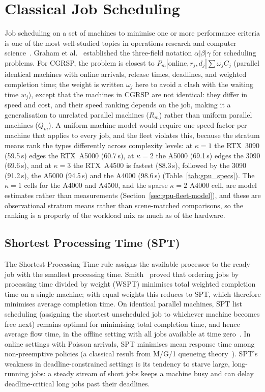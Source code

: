 \section{Classical Job Scheduling}
\label{sec:classical-job-scheduling}

Job scheduling on a set of machines to minimise one or more performance criteria is one of the most well-studied topics in operations research and computer science~\cite{pinedo2016scheduling}. Graham et al.~\cite{graham1979optimization} established the three-field notation $\alpha|\beta|\gamma$ for scheduling problems. For CGRSP, the problem is closest to $P_m|\text{online}, r_j, d_j|\sum \omega_j C_j$ (parallel identical machines with online arrivals, release times, deadlines, and weighted completion time; the weight is written $\omega_j$ here to avoid a clash with the waiting time $w_j$), except that the machines in CGRSP are not identical: they differ in speed and cost, and their speed ranking depends on the job, making it a generalisation to unrelated parallel machines ($R_m$) rather than uniform parallel machines ($Q_m$). A uniform-machine model would require one speed factor per machine that applies to every job, and the fleet violates this, because the stratum means rank the types differently across complexity levels: at $\kappa=1$ the RTX~3090 (59.5\,s) edges the RTX~A5000 (60.7\,s), at $\kappa=2$ the A5000 (69.1\,s) edges the 3090 (69.6\,s), and at $\kappa=3$ the RTX~A4500 is fastest (88.3\,s), followed by the 3090 (91.2\,s), the A5000 (94.5\,s) and the A4000 (98.6\,s) (Table~\ref{tab:gpu_specs}). The $\kappa=1$ cells for the A4000 and A4500, and the sparse $\kappa=2$ A4000 cell, are model estimates rather than measurements (Section~\ref{sec:gpu-fleet-model}), and these are observational stratum means rather than scene-matched comparisons, so the ranking is a property of the workload mix as much as of the hardware.

\subsection{Shortest Processing Time (SPT)}
\label{ssec:shortest-processing-time-spt}

The Shortest Processing Time rule assigns the available processor to the ready job with the smallest processing time. Smith~\cite{smith1956various} proved that ordering jobs by processing time divided by weight (WSPT) minimises total weighted completion time on a single machine; with equal weights this reduces to SPT, which therefore minimises average completion time. On identical parallel machines, SPT list scheduling (assigning the shortest unscheduled job to whichever machine becomes free next) remains optimal for minimising total completion time, and hence average flow time, in the offline setting with all jobs available at time zero~\cite{pinedo2016scheduling}. In online settings with Poisson arrivals, SPT minimises mean response time among non-preemptive policies (a classical result from M/G/1 queueing theory~\cite{pinedo2016scheduling}). SPT's weakness in deadline-constrained settings is its tendency to starve large, long-running jobs: a steady stream of short jobs keeps a machine busy and can delay deadline-critical long jobs past their deadlines.

